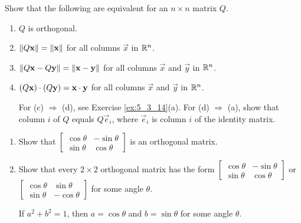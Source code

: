 \documentclass{ximera}
\begin{document}
\begin{problem}\label{prob:ortho25}
Show that the following are equivalent for an $n \times n$ matrix $Q$.


\begin{enumerate} 
\item $Q$ is orthogonal.

\item $\left\lVert Q\mathbf{x}\right\rVert = \left\lVert\mathbf{x}\right\rVert$ for all columns $\vec{x}$ in $\mathbb{R}^n$.

\item $\left\lVert Q\mathbf{x} - Q\mathbf{y}\right\rVert = \left\lVert\mathbf{x} - \mathbf{y}\right\rVert$ for all columns $\vec{x}$ and $\vec{y}$ in $\mathbb{R}^n$.

\item $(Q\mathbf{x}) \cdot (Q\mathbf{y}) = \mathbf{x} \cdot \mathbf{y}$ for all columns $\vec{x}$ and $\vec{y}$ in $\mathbb{R}^n$.

\begin{hint}
For (c) $\Rightarrow$ (d), see Exercise \ref{ex:5_3_14}(a). For (d) $\Rightarrow$ (a), show that column $i$ of $Q$ equals $Q\vec{e}_{i}$, where $\vec{e}_{i}$ is column $i$ of the identity matrix.
\end{hint}
\end{enumerate}
\end{problem}



\begin{problem}\label{prob:rotation_ortho}
\begin{enumerate}
    \item Show that $\begin{bmatrix}
\cos\theta & -\sin\theta \\
\sin\theta & \cos\theta
\end{bmatrix}$ is an orthogonal matrix.

    \item Show that every $2 \times 2$ orthogonal matrix has the form $\begin{bmatrix}
\cos\theta & -\sin\theta \\
\sin\theta & \cos\theta
\end{bmatrix}$ or $\begin{bmatrix}
\cos\theta & \sin\theta \\
\sin\theta & -\cos\theta
\end{bmatrix}$
 for some angle $\theta$.
 \begin{hint}
 If $a^{2} + b^{2} = 1$, then $a = \cos\theta$ and $b = \sin\theta$ for some angle $\theta$.
 \end{hint}
\end{enumerate}

\end{problem}
\end{document}

